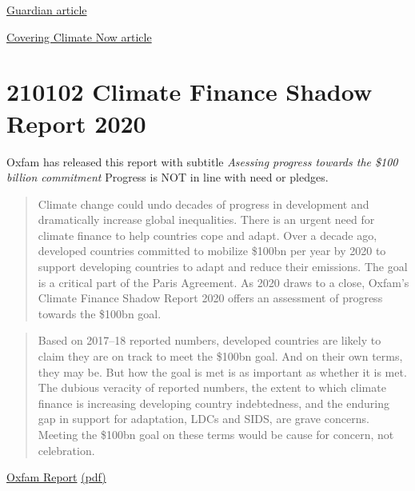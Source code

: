 \documentclass[
]{book}
\begin{document}
\href{https://www.theguardian.com/us-news/2020/oct/02/donald-trump-climate-change-michael-mann-interview}{Guardian article}

\href{https://www.cjr.org/covering_climate_now/michael-mann-60-minutes-emissions-warming.php}{Covering Climate Now article}

\hypertarget{climate-finance-shadow-report-2020}{%
\section{210102 Climate Finance Shadow Report 2020}\label{climate-finance-shadow-report-2020}}

Oxfam has released this report with subtitle \emph{Asessing progress towards the \$100 billion commitment}
Progress is NOT in line with need or pledges.

\begin{quote}
Climate change could undo decades of progress in development and dramatically increase global inequalities. There is an urgent need for climate finance to help countries cope and adapt.
Over a decade ago, developed countries committed to mobilize \$100bn per year by 2020 to support developing countries to adapt and reduce their emissions. The goal is a critical part of the Paris Agreement.
As 2020 draws to a close, Oxfam's Climate Finance Shadow Report 2020 offers an assessment of progress towards the \$100bn goal.
\end{quote}

\begin{quote}
Based on 2017--18 reported numbers, developed countries are likely to claim they are on track to meet
the \$100bn goal. And on their own terms, they may be. But how the goal is met is as important as whether
it is met. The dubious veracity of reported numbers, the extent to which climate finance is increasing
developing country indebtedness, and the enduring gap in support for adaptation, LDCs and SIDS, are grave
concerns. Meeting the \$100bn goal on these terms would be cause for concern, not celebration.
\end{quote}

\href{https://www.oxfam.org/en/research/climate-finance-shadow-report-2020}{Oxfam Report}
\href{/pdf/Oxfam_2020_Climate_Finance_Shadow_Report.pdf}{(pdf)}

  
\end{document}
